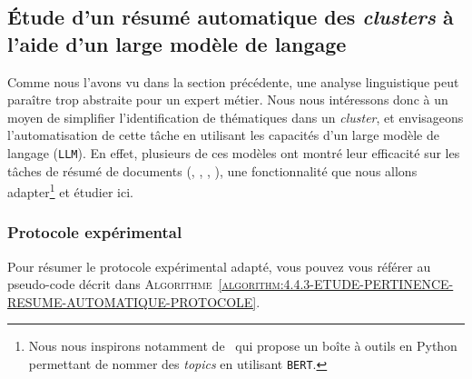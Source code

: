	
	\subsection{Étude d'un résumé automatique des \textit{clusters} à l'aide d'un large modèle de langage}
	\label{section:4.4.3-ETUDE-PERTINENCE-RESUME-AUTOMATIQUE}
		
		Comme nous l'avons vu dans la section précédente, une analyse linguistique peut paraître trop abstraite pour un expert métier.
		Nous nous intéressons donc à un moyen de simplifier l'identification de thématiques dans un \textit{cluster}, et envisageons l'automatisation de cette tâche en utilisant les capacités d'un large modèle de langage (\texttt{LLM}).
		En effet, plusieurs de ces modèles ont montré leur efficacité sur les tâches de résumé de documents (\cite{zhang-etal:2019:pegasus-pretraining-extracted}, \cite{lewis-etal:2019:bart-denoising-sequencetosequence}, \cite{radford-etal:2019:language-models-are}, \cite{brown-etal:2020:language-models-are}), une fonctionnalité que nous allons adapter\footnote{Nous nous inspirons notamment de~\cite{alammar-grefenstette:2022:cohere-sandbox} qui propose un boîte à outils en Python permettant de nommer des \textit{topics} en utilisant \texttt{BERT}.} et étudier ici.
	
		\subsubsection{Protocole expérimental}
			
			Pour résumer le protocole expérimental adapté, vous pouvez vous référer au pseudo-code décrit dans \textsc{Algorithme~\ref{algorithm:4.4.3-ETUDE-PERTINENCE-RESUME-AUTOMATIQUE-PROTOCOLE}}.
			
